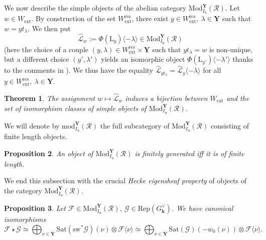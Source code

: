 \documentclass[11pt]{amsart}
\theoremstyle{plain}
\newtheorem{thm}{Theorem}[section]
\newtheorem{prop}[thm]{Proposition}
\theoremstyle{remark}
\numberwithin{equation}{section}
\begin{document}
	We now describe the simple objects of the abelian category $\mathrm{Mod}^\mathbf{Y}_{I_\mathrm{u}}(\mathcal{R})$. Let $w\in W_{\mathrm{ext}}$. By construction of the set $W_{\mathrm{ext}}^{\mathrm{res}}$, there exist $y\in W_{\mathrm{ext}}^{\mathrm{res}},~\lambda\in \mathbf{Y}$ such that $w=yt_\lambda$. We then put 
	$$\widehat{\mathcal{L}}_w:=\Phi(\mathrm{L}_y)\langle-\lambda\rangle\in \mathrm{Mod}^\mathbf{Y}_{I_\mathrm{u}}(\mathcal{R})$$
 (here the choice of a couple $(y,\lambda)\in W_{\mathrm{ext}}^{\mathrm{res}}\times\mathbf{Y}$ such that $yt_\lambda=w$ is non-unique, but a different choice $(y',\lambda')$ yields an isomorphic object $\Phi(\mathrm{L}_{y'})\langle-\lambda'\rangle$ thanks to the comments in \cite[§5.5]{achar2022geometric}). We thus have the equality $\widehat{\mathcal{L}}_{yt_\lambda}=\widehat{\mathcal{L}}_y\langle-\lambda\rangle$ for all $y\in W_{\mathrm{ext}}^{\mathrm{res}},~\lambda\in \mathbf{Y}$.
	\begin{thm}{{\cite[Theorem 5.6]{achar2022geometric}}}\label{thm simple g1t}
		The assignment $w\mapsto \widehat{\mathcal{L}}_{w}$ induces a bijection between $W_{\mathrm{ext}}$ and the set of isomorphism classes of simple objects of $\mathrm{Mod}^\mathbf{Y}_{I_\mathrm{u}}(\mathcal{R})$.
	\end{thm}
	We will denote by $\mathrm{mod}^\mathbf{Y}_{I_\mathrm{u}}(\mathcal{R})$ the full subcategory of $\mathrm{Mod}^\mathbf{Y}_{I_\mathrm{u}}(\mathcal{R})$ consisting of finite length objects.  
	\begin{prop}{{\cite[Theorem 7.9]{achar2022geometric}}}\label{prop finite length}
		An object of $\mathrm{Mod}^\mathbf{Y}_{I_\mathrm{u}}(\mathcal{R})$ is finitely generated iff it is of finite length.
	\end{prop}
 We end this subsection with the crucial \textit{Hecke eigensheaf property} of objects of the category $\mathrm{Mod}^\mathbf{Y}_{I_\mathrm{u}}(\mathcal{R})$.
 \begin{prop}\label{prop Hecke property}
     Let $\mathcal{F}\in \mathrm{Mod}^\mathbf{Y}_{I_\mathrm{u}}(\mathcal{R}),~\mathcal{G}\in \mathrm{Rep}(G^\vee_\mathbf{k})$. We have canonical isomorphisms
     $$\mathcal{F}\star\mathcal{G}\simeq\bigoplus_{\nu\in\mathbf{Y}}\mathrm{Sat}(\mathrm{sw}^*\mathcal{G})(\nu)\otimes\mathcal{F}\langle\nu\rangle\simeq\bigoplus_{\nu\in\mathbf{Y}}\mathrm{Sat}(\mathcal{G})(-w_0(\nu))\otimes\mathcal{F}\langle\nu\rangle.  $$
 \end{prop}
\end{document}

